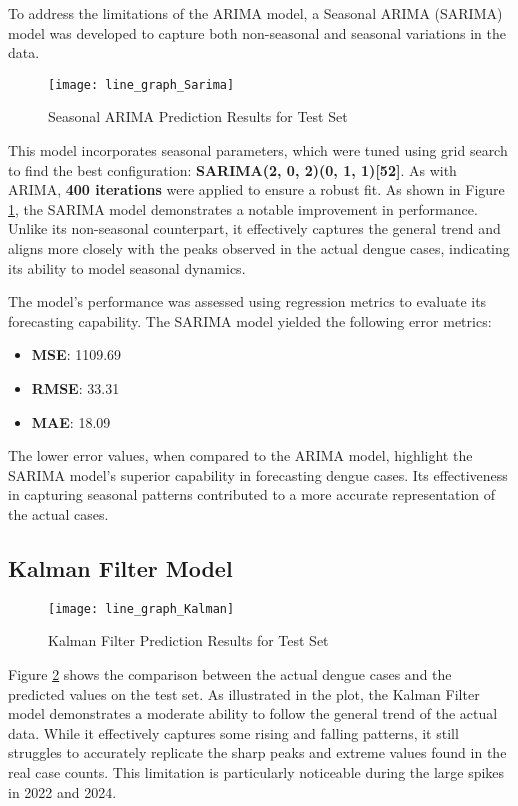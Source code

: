To address the limitations of the ARIMA model, a Seasonal ARIMA (SARIMA) model was developed to capture both non-seasonal and seasonal variations in the data.

\begin{figure}[H]
	\centering
	\texttt{[image: line\_graph\_Sarima]}
	\caption{Seasonal ARIMA Prediction Results for Test Set}
	\label{fig:Sarima_result}
\end{figure}

This model incorporates seasonal parameters, which were tuned using grid search to find the best configuration: \textbf{SARIMA(2, 0, 2)(0, 1, 1)[52]}. As with ARIMA, \textbf{400 iterations} were applied to ensure a robust fit. As shown in Figure \ref{fig:Sarima_result}, the SARIMA model demonstrates a notable improvement in performance. Unlike its non-seasonal counterpart, it effectively captures the general trend and aligns more closely with the peaks observed in the actual dengue cases, indicating its ability to model seasonal dynamics.

The model's performance was assessed using regression metrics to evaluate its forecasting capability. The SARIMA model yielded the following error metrics: \begin{itemize} \item \textbf{MSE}: 1109.69 \item \textbf{RMSE}: 33.31 \item \textbf{MAE}: 18.09 \end{itemize} The lower error values, when compared to the ARIMA model, highlight the SARIMA model's superior capability in forecasting dengue cases. Its effectiveness in capturing seasonal patterns contributed to a more accurate representation of the actual cases.



\subsection{Kalman Filter Model}

\begin{figure}[H]
	\centering
	\texttt{[image: line\_graph\_Kalman]}
	\caption{Kalman Filter Prediction Results for Test Set}
	\label{fig:Kalman_result}
\end{figure}

Figure \ref{fig:Kalman_result} shows the comparison between the actual dengue cases and the predicted values on the test set. As illustrated in the plot, the Kalman Filter model demonstrates a moderate ability to follow the general trend of the actual data. While it effectively captures some rising and falling patterns, it still struggles to accurately replicate the sharp peaks and extreme values found in the real case counts. This limitation is particularly noticeable during the large spikes in 2022 and 2024.
\\

